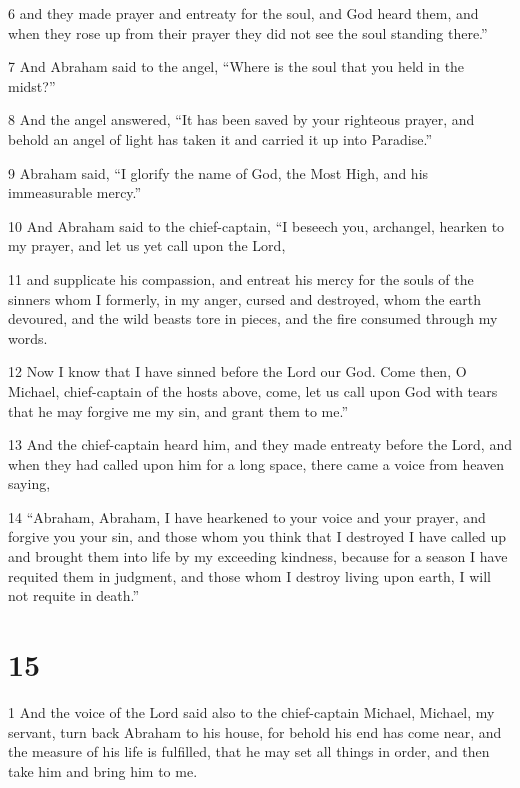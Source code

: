 \par 6 and they made prayer and entreaty for the soul, and God heard them, and when they rose up from their prayer they did not see the soul standing there.” 

\par 7 And Abraham said to the angel, “Where is the soul that you held in the midst?” 

\par 8 And the angel answered, “It has been saved by your righteous prayer, and behold an angel of light has taken it and carried it up into Paradise.” 

\par 9 Abraham said, “I glorify the name of God, the Most High, and his immeasurable mercy.” 

\par 10 And Abraham said to the chief-captain, “I beseech you, archangel, hearken to my prayer, and let us yet call upon the Lord, 

\par 11 and supplicate his compassion, and entreat his mercy for the souls of the sinners whom I formerly, in my anger, cursed and destroyed, whom the earth devoured, and the wild beasts tore in pieces, and the fire consumed through my words. 

\par 12 Now I know that I have sinned before the Lord our God. Come then, O Michael, chief-captain of the hosts above, come, let us call upon God with tears that he may forgive me my sin, and grant them to me.” 

\par 13 And the chief-captain heard him, and they made entreaty before the Lord, and when they had called upon him for a long space, there came a voice from heaven saying, 

\par 14 “Abraham, Abraham, I have hearkened to your voice and your prayer, and forgive you your sin, and those whom you think that I destroyed I have called up and brought them into life by my exceeding kindness, because for a season I have requited them in judgment, and those whom I destroy living upon earth, I will not requite in death.”

\chapter{15}

\par 1 And the voice of the Lord said also to the chief-captain Michael, Michael, my servant, turn back Abraham to his house, for behold his end has come near, and the measure of his life is fulfilled, that he may set all things in order, and then take him and bring him to me. 

